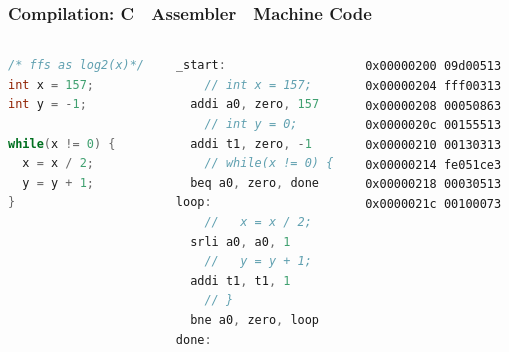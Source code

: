 \documentclass{beamer}
\begin{document}
\begin{frame}[fragile,shrink=10]
\frametitle{Compilation: C  Assembler  Machine Code}

\begin{columns}
\begin{column}{0.3\textwidth}
\begin{lstlisting}[language={C},columns=flexible]
/* ffs as log2(x)*/
int x = 157;
int y = -1;
 
while(x != 0) {
  x = x / 2;
  y = y + 1;
}
\end{lstlisting}
\end{column}

\begin{column}{0.4\textwidth}  
\begin{lstlisting}[language={C},columns=flexible]
_start:
    // int x = 157;
  addi a0, zero, 157  
    // int y = 0;
  addi t1, zero, -1   
    // while(x != 0) {
  beq a0, zero, done  
loop:
    //   x = x / 2;
  srli a0, a0, 1 
    //   y = y + 1;
  addi t1, t1, 1      
    // }
  bne a0, zero, loop  
done:
\end{lstlisting}
\end{column}

\begin{column}{0.3\textwidth}  
\texttt{0x00000200  09d00513\\
0x00000204  fff00313\\
0x00000208  00050863\\
0x0000020c  00155513\\
0x00000210  00130313\\
0x00000214  fe051ce3\\
0x00000218  00030513\\
0x0000021c  00100073}
\end{column}

\end{columns}

\end{frame}
\end{document}
